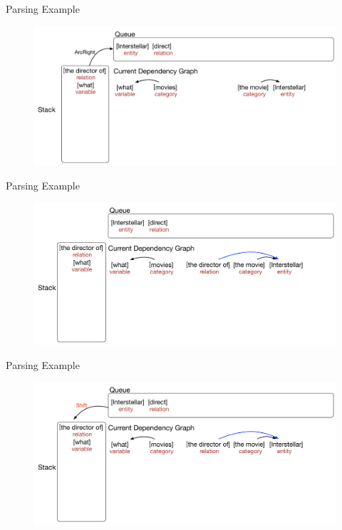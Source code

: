 \documentclass{beamer}
\begin{document}
\begin{frame}{Parsing Example}
	\begin{figure}
		\centering\includegraphics[width=1.0\textwidth]{introduction/parsing_examples/20.pdf}
	\end{figure}	
\end{frame}

\begin{frame}{Parsing Example}
	\large
	\begin{figure}
		\centering\includegraphics[width=1.0\textwidth]{introduction/parsing_examples/21.pdf}
	\end{figure}	
\end{frame}

\begin{frame}{Parsing Example}
	\begin{figure}
		\centering\includegraphics[width=1.0\textwidth]{introduction/parsing_examples/22.pdf}
	\end{figure}	
\end{frame}
\end{document}
